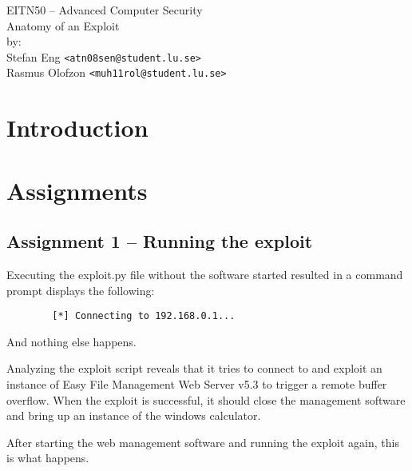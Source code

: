 \documentclass[10pt]{article}
\begin{document}

  \thispagestyle{empty}
  \vspace*{3cm}
  \begin{center}
    \huge{EITN50 -- Advanced Computer Security} \\
    \vspace{0.3cm}
    \LARGE{Anatomy of an Exploit} \\
    \vspace{1cm}
    \large{by: \\ \vspace{0.2cm}
        Stefan Eng \texttt{<atn08sen@student.lu.se>} \\
        Rasmus Olofzon \texttt{<muh11rol@student.lu.se>}
        } \\
  \end{center}


  \newpage

  \section*{Introduction}

  \section{Assignments}

    \subsection{Assignment 1 -- Running the exploit}

      Executing the exploit.py file without the software started resulted in a
      command prompt displays the following:
      \begin{verbatim}
        [*] Connecting to 192.168.0.1...
      \end{verbatim}
      And nothing else happens.

      Analyzing the exploit script reveals that it tries to connect to and
      exploit an instance of Easy File Management Web Server v5.3 to trigger a
      remote buffer overflow. When the exploit is successful, it should close the
      management software and bring up an instance of the windows calculator.

      After starting the web management software and running the exploit again,
      this is what happens.
\end{document}
